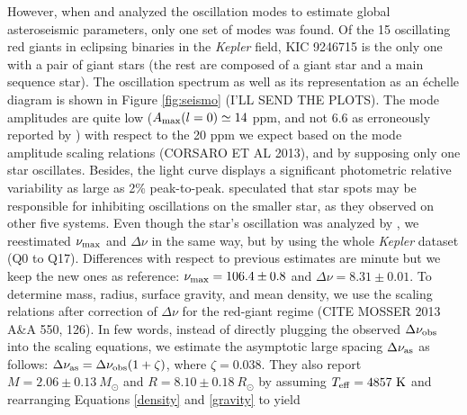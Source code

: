 However, when \citet{gau13} and \citet{gau14} analyzed the oscillation modes to estimate global asteroseismic parameters, only one set of modes was found. Of the 15 oscillating red giants in eclipsing binaries in the \emph{Kepler} field, KIC 9246715 is the only one with a pair of giant stars (the rest are composed of a giant star and a main sequence star). The oscillation spectrum as well as its representation as an \'echelle diagram is shown in Figure \ref{fig:seismo} (I'LL SEND THE PLOTS). The mode amplitudes are quite low ($A_{\rm{max}}(l=0) \simeq 14$ ppm, and not 6.6 as erroneously reported by \citealt{gau14}) with respect to the 20 ppm we expect  based on the mode amplitude scaling relations (CORSARO ET AL 2013), and by supposing only one star oscillates. Besides, the light curve displays a significant photometric relative variability as large as 2\% peak-to-peak. \citet{gau14} speculated that star spots may be responsible for inhibiting oscillations on the smaller star, as they observed on other five systems. Even though the star's oscillation was analyzed by \citet{gau14}, we reestimated $\nu_{\rm{max}}$ and $\Delta\nu$ in the same way, but by using the whole \textit{Kepler} dataset (Q0 to Q17). Differences with respect to previous estimates are minute but we keep the new ones as reference: $\nu_{\rm{max}} = 106.4 \pm 0.8$ and $\Delta\nu=8.31\pm0.01$. To determine mass, radius, surface gravity, and mean density, we use the scaling relations after correction of $\Delta\nu$ for the red-giant regime (CITE MOSSER 2013 A\&A 550, 126). In few words, instead of directly plugging the observed $\Delta\nu_{\rm{obs}}$ into the scaling equations, we estimate the asymptotic large spacing $\Delta\nu_{\rm{as}}$ as follows: $\Delta\nu_{\rm{as}} = \Delta\nu_{\rm{obs}} (1 + \zeta)$, where $\zeta = 0.038$.
They also report $M = 2.06 \pm 0.13 \ M_{\odot}$ and $R = 8.10 \pm 0.18 \ R_{\odot}$ by assuming $T_{\rm{eff}} = 4857 \ \rm{K}$ and rearranging Equations \ref{density} and \ref{gravity} to yield




